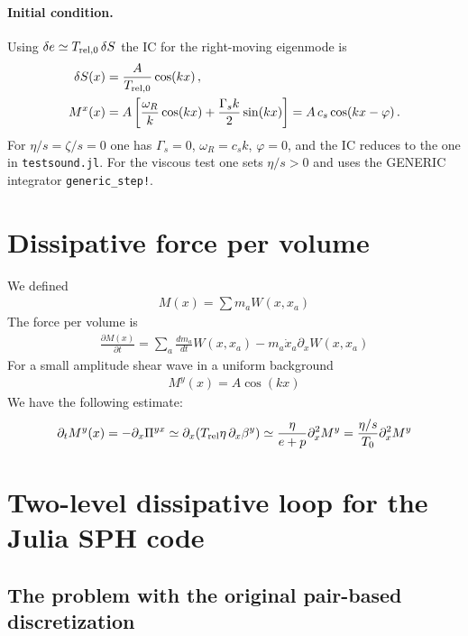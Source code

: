 \documentclass[12pt,aps,preprint,nofootinbib,noshowkeys,noshowpacs,longbibliography,superscriptaddress,tightenlines]{revtex4-2}
\begin{document}
\paragraph{Initial condition.}
Using $\delta e \simeq T_{{\rm rel},0}\,\delta S$ the IC for the right-moving
eigenmode is
\begin{align}
\label{eq:sound_ic}
  \delta S(x) &= \frac{A}{T_{{\rm rel},0}}\cos(kx) \,, \\
  M^x(x)      &= A\left[\frac{\omega_R}{k}\cos(kx)
                        +\frac{\Gamma_s k}{2}\sin(kx)\right]
               = A\,c_s\cos(kx - \varphi) \,.
\end{align}
For $\eta/s = \zeta/s = 0$ one has $\Gamma_s = 0$, $\omega_R = c_s k$,
$\varphi = 0$, and the IC reduces to the one in \texttt{testsound.jl}.
For the viscous test one sets $\eta/s > 0$ and uses the GENERIC integrator
\texttt{generic\_step!}.

\section{ Dissipative force per volume}

We defined
\begin{align}
  M(x) = \sum m_a W(x, x_a)
\end{align}
The force per volume is  
\begin{align}
     \frac{\partial M(x)}{\partial t} =  \sum_a  \frac{dm_a}{dt} W(x, x_a)   -  m_a \dot x_a  \partial_x W(x, x_a)  
\end{align}
For a small amplitude shear wave in a uniform background
\begin{align}
  M^y (x) = A \cos(kx) 
\end{align}
We have  the following estimate:
\begin{align}
  \partial_t M^y(x) = - \partial_x \Pi^{yx}  \simeq  \partial_x  (T_{\rm rel }\eta \, \partial_x \beta^y) \simeq  \frac{\eta}{e + p } \partial_x^2 M^y = \frac{\eta/s}{T_0} \partial_x^2 M^y
\end{align}


\section{Two-level dissipative loop for the Julia SPH code}
\label{app:dissipative_loop}

\subsection*{The problem with the original pair-based discretization}
\end{document}
